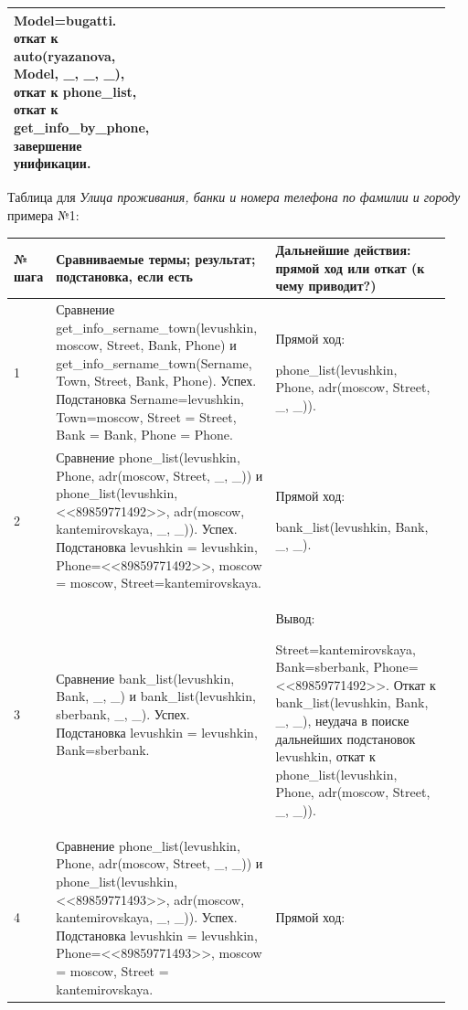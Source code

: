 \documentclass[a4paper,12pt]{article}
\begin{document}
\begin{table} [h!]
\begin{center}
\begin{tabular}{|p{0.05\linewidth}|p{0.5\linewidth}|p{0.4\linewidth}|}
{					Model=bugatti. откат к auto(ryazanova, Model, \_, \_, \_), откат к phone\_list, откат к get\_info\_by\_phone, завершение унификации.}\\
				\hline
			\end{tabular}  
			\label{m5}
		\end{center}
	\end{table}
	
	\newpage
	
	Таблица для \textit{Улица проживания, банки и номера телефона по фамилии и городу} примера №1:
	
	\begin{table} [h!]
		\begin{center}
			\begin{tabular}{|p{0.05\linewidth}|p{0.5\linewidth}|p{0.4\linewidth}|}
				\hline
				{\bf  № шага} & {\bf Сравниваемые термы; результат; подстановка, если есть} & {\bf Дальнейшие действия: прямой ход или откат (к чему приводит?)} \\
				\hline
				{1} & {Сравнение get\_info\_sername\_town(levushkin, moscow, Street, Bank, Phone) и get\_info\_sername\_town(Sername, Town, Street, Bank, Phone). Успех. Подстановка Sername=levushkin, Town=moscow, Street = Street, Bank = Bank, Phone = Phone.} & {Прямой ход:
					
					phone\_list(levushkin, Phone, adr(moscow, Street, \_, \_)).}\\
				\hline
				{2} & {Сравнение phone\_list(levushkin, Phone, adr(moscow, Street, \_, \_)) и phone\_list(levushkin, <<89859771492>>, adr(moscow, kantemirovskaya, \_, \_)). Успех. Подстановка levushkin = levushkin, Phone=<<89859771492>>, moscow = moscow, Street=kantemirovskaya.} & {Прямой ход: 
					
					bank\_list(levushkin, Bank, \_, \_).}\\
				\hline
				{3} & {Сравнение bank\_list(levushkin, Bank, \_, \_) и bank\_list(levushkin, sberbank, \_, \_). Успех. Подстановка levushkin = levushkin, Bank=sberbank.} & {Вывод:
					
					Street=kantemirovskaya, Bank=sberbank, Phone=<<89859771492>>. Откат к bank\_list(levushkin, Bank, \_, \_), неудача в поиске дальнейших подстановок levushkin, откат к phone\_list(levushkin, Phone, adr(moscow, Street, \_, \_)).}\\
				\hline
				{4} & {Сравнение phone\_list(levushkin, Phone, adr(moscow, Street, \_, \_)) и phone\_list(levushkin, <<89859771493>>, adr(moscow, kantemirovskaya, \_, \_)). Успех. Подстановка levushkin = levushkin, Phone=<<89859771493>>, moscow = moscow, Street = kantemirovskaya.} & {Прямой ход:
					
}
\end{tabular}
\end{center}
\end{table}
\end{document}
